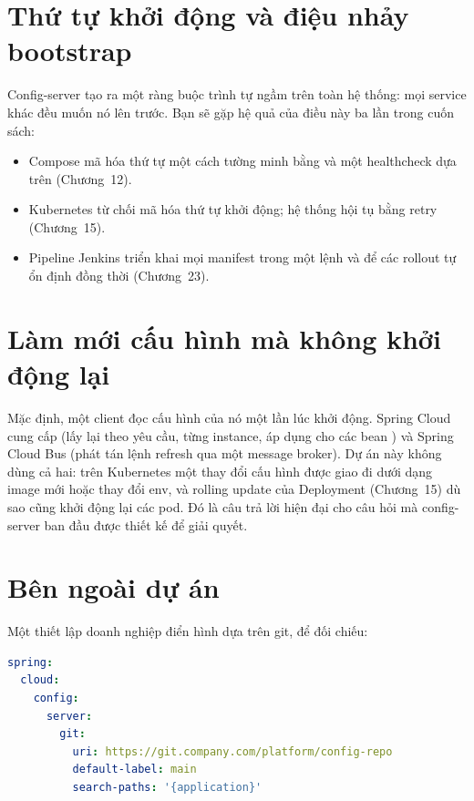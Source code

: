 \section{Thứ tự khởi động và điệu nhảy bootstrap}

Config-server tạo ra một ràng buộc trình tự ngầm trên toàn hệ thống: mọi
service khác đều muốn nó lên trước. Bạn sẽ gặp hệ quả của điều này ba lần
trong cuốn sách:

\begin{itemize}
  \item Compose mã hóa thứ tự một cách tường minh bằng 
  và một healthcheck dựa trên  (Chương~12).
  \item Kubernetes từ chối mã hóa thứ tự khởi động; hệ thống hội tụ bằng
  retry (Chương~15).
  \item Pipeline Jenkins triển khai mọi manifest trong một lệnh
   và để các rollout tự ổn định đồng thời
  (Chương~23).
\end{itemize}

\section{Làm mới cấu hình mà không khởi động lại}

Mặc định, một client đọc cấu hình của nó một lần lúc khởi động. Spring
Cloud cung cấp  (lấy lại theo yêu cầu, từng
instance, áp dụng cho các bean ) và Spring Cloud Bus
(phát tán lệnh refresh qua một message broker). Dự án này không dùng cả
hai: trên Kubernetes một thay đổi cấu hình được giao đi dưới dạng image
mới hoặc thay đổi env, và rolling update của Deployment (Chương~15) dù
sao cũng khởi động lại các pod. Đó là câu trả lời hiện đại cho câu hỏi mà
config-server ban đầu được thiết kế để giải quyết.

\section{Bên ngoài dự án}

Một thiết lập doanh nghiệp điển hình dựa trên git, để đối chiếu:

\begin{lstlisting}[language=yaml]
spring:
  cloud:
    config:
      server:
        git:
          uri: https://git.company.com/platform/config-repo
          default-label: main
          search-paths: '{application}'
\end{lstlisting}

